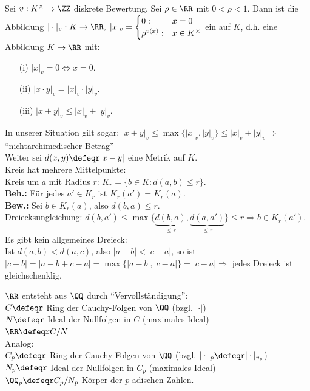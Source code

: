 \begin{Bem} 
Sei $v: K^{\times} \to \ZZ$ diskrete Bewertung.
Sei $\rho \in \RR$ mit $0 < \rho < 1$.
Dann ist die Abbildung $|\cdot|_v: K \to \RR, \; |x|_v = \begin{cases}0: & x
= 0 \\\rho^{v(x)}: & x \in K^{\times}\end{cases}$ ein
 auf $K$, d.h. eine Abbildung $K \to
\RR$ mit:
\begin{enumerate}
  \item[(i)] $|x|_v = 0 \Leftrightarrow x = 0$.
  \item[(ii)] $|x \cdot y|_v = |x|_v \cdot |y|_v$.
  \item[(iii)] $|x + y|_v \leq |x|_v + |y|_v$.
\end{enumerate}
In unserer Situation gilt sogar: $|x + y|_v \leq \max\{|x|_v,|y|_v\} \leq |x|_v
+ |y|_v \Rightarrow$ ``nichtarchimedischer Betrag''\\
Weiter sei $d(x,y) \defeqr|x - y|$ eine Metrik auf $K$.\\
Kreis hat mehrere Mittelpunkte:\\
Kreis um $a$ mit Radius $r$: $K_r = \{b \in K: d(a,b) \leq r\}$.\\
\textbf{Beh.:} Für jedes $a' \in K_r$ ist $K_r(a') = K_r(a)$.\\
\textbf{Bew.:} Sei $b \in K_r(a)$, also $d(b,a) \leq r$.\\
Dreiecksungleichung: $d(b,a') \leq \max\{\underset{\leq
r}{\underbrace{d(b,a)}},\underset{\leq r}{\underbrace{d(a,a')}}\} \leq r \Rightarrow b \in
K_r(a')$.\\
Es gibt kein allgemeines Dreieck:\\
Ist $d(a,b) < d(a,c)$, also $|a-b| < |c-a|$, so ist $|c-b| = |a-b+c-a| =
\max\{|a-b|,|c-a|\} = |c-a| \Rightarrow$ jedes Dreieck ist gleichschenklig.
\end{Bem}

\begin{Eri}
$\RR$ entsteht aus $\QQ$ durch ``Vervollständigung'':\\
$C \defeqr$ Ring der Cauchy-Folgen von $\QQ$ (bzgl. $|\cdot|$)\\
$N \defeqr$ Ideal der Nullfolgen in $C$ (maximales Ideal)\\
$\RR \defeqr C/N$\\
Analog:\\
$C_p \defeqr$ Ring der Cauchy-Folgen von $\QQ$ (bzgl. $|\cdot|_p \defeqr
|\cdot|_{v_p}$)\\
$N_p \defeqr$ Ideal der Nullfolgen in $C_p$ (maximales Ideal)\\
$\QQ_p \defeqr C_p/N_p$ \glqq Körper der $p$-adischen Zahlen\grqq.
\end{Eri}

